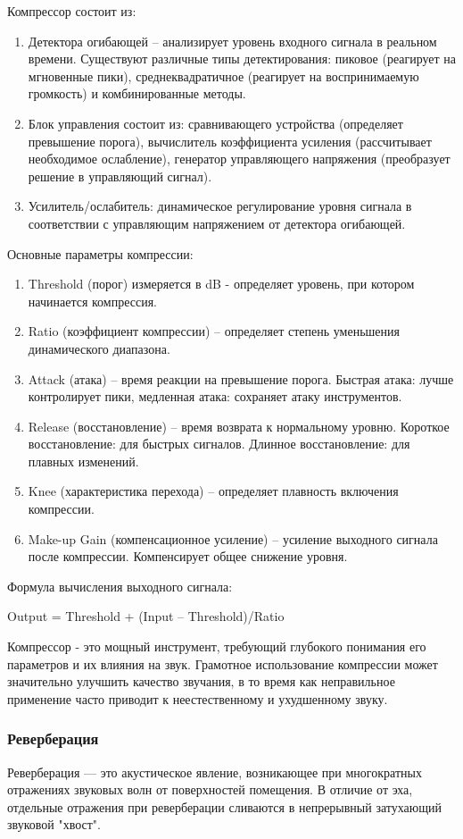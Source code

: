 Компрессор состоит из:
\begin{enumerate}
	\item Детектора огибающей – анализирует уровень входного сигнала в реальном времени. Существуют различные типы детектирования: пиковое (реагирует на мгновенные пики), среднеквадратичное (реагирует на воспринимаемую громкость) и комбинированные методы.
	\item Блок управления состоит из: сравнивающего устройства (определяет превышение порога), вычислитель коэффициента усиления (рассчитывает необходимое ослабление), генератор управляющего напряжения (преобразует решение в управляющий сигнал).
	\item Усилитель/ослабитель: динамическое регулирование уровня сигнала в соответствии с управляющим напряжением от детектора огибающей.
\end{enumerate}

Основные параметры компрессии:
\begin{enumerate}
	\item Threshold (порог) измеряется в dB - определяет уровень, при котором начинается компрессия.
	\item Ratio (коэффициент компрессии) – определяет степень уменьшения динамического диапазона.
	\item Attack (атака) – время реакции на превышение порога. Быстрая атака: лучше контролирует пики, медленная атака: сохраняет атаку инструментов.
	\item Release (восстановление) – время возврата к нормальному уровню. Короткое восстановление: для быстрых сигналов. Длинное восстановление: для плавных изменений.
	\item Knee (характеристика перехода) – определяет плавность включения компрессии.
	\item Make-up Gain (компенсационное усиление) – усиление выходного сигнала после компрессии. Компенсирует общее снижение уровня.
\end{enumerate}


Формула вычисления выходного сигнала:

Output = Threshold + (Input – Threshold)/Ratio

Компрессор - это мощный инструмент, требующий глубокого понимания его параметров и их влияния на звук. Грамотное использование компрессии может значительно улучшить качество звучания, в то время как неправильное применение часто приводит к неестественному и ухудшенному звуку.

\subsubsection{Реверберация}
Реверберация — это акустическое явление, возникающее при многократных отражениях звуковых волн от поверхностей помещения. В отличие от эха, отдельные отражения при реверберации сливаются в непрерывный затухающий звуковой "хвост".

